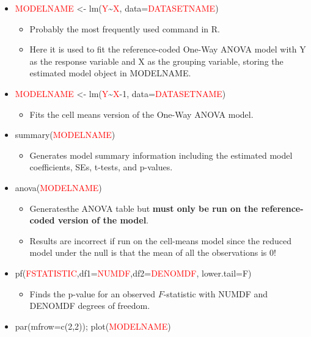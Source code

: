 \documentclass[]{book}
\providecommand{\tightlist}{%
  \setlength{\itemsep}{0pt}\setlength{\parskip}{0pt}}
\theoremstyle{definition}
\theoremstyle{definition}
\theoremstyle{remark}
\begin{document}
\begin{itemize}
\item
  \textcolor{red}{MODELNAME} \textless{}-
  lm(\textcolor{red}{Y}\textasciitilde{}\textcolor{red}{X},
  data=\textcolor{red}{DATASETNAME})

  \begin{itemize}
  \item
    Probably the most frequently used command in R.
  \item
    Here it is used to fit the reference-coded One-Way ANOVA model with
    Y as the response variable and X as the grouping variable, storing
    the estimated model object in MODELNAME.
  \end{itemize}
\item
  \textcolor{red}{MODELNAME} \textless{}-
  lm(\textcolor{red}{Y}\textasciitilde{}\textcolor{red}{X}-1,
  data=\textcolor{red}{DATASETNAME})

  \begin{itemize}
  \tightlist
  \item
    Fits the cell means version of the One-Way ANOVA model.
  \end{itemize}
\item
  summary(\textcolor{red}{MODELNAME})

  \begin{itemize}
  \tightlist
  \item
    Generates model summary information including the estimated model
    coefficients, SEs, t-tests, and p-values.
  \end{itemize}
\item
  anova(\textcolor{red}{MODELNAME})

  \begin{itemize}
  \item
    Generatesthe ANOVA table but \textbf{must only be run on the
    reference-coded version of the model}.
  \item
    Results are incorrect if run on the cell-means model since the
    reduced model under the null is that the mean of all the
    observations is 0!
  \end{itemize}
\item
  pf(\textcolor{red}{FSTATISTIC},df1=\textcolor{red}{NUMDF},df2=\textcolor{red}{DENOMDF},
  lower.tail=F)

  \begin{itemize}
  \tightlist
  \item
    Finds the p-value for an observed \(F\)-statistic with NUMDF and
    DENOMDF degrees of freedom.
  \end{itemize}
\item
  par(mfrow=c(2,2)); plot(\textcolor{red}{MODELNAME})


\end{itemize}
\end{document}
